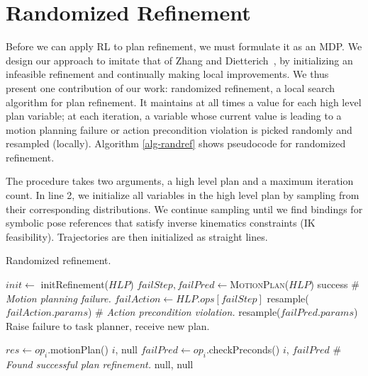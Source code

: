 \section{Randomized Refinement}
Before we can apply RL to plan refinement, we must formulate it as an MDP.
We design our approach to imitate that of Zhang and Dietterich~\cite{JobShopSched}, by
initializing an infeasible refinement and continually making local improvements.
We thus present one contribution of our work: randomized refinement, a local search
algorithm for plan refinement. It maintains at all times a value for each high level plan
variable; at each iteration, a variable whose current value is leading to a motion planning failure or
action precondition violation is picked randomly and resampled (locally).
Algorithm \ref{alg-randref} shows pseudocode for randomized refinement.

The procedure takes two arguments, a high level plan and a maximum
iteration count. In line 2, we initialize all variables in the high level plan by sampling
from their corresponding distributions. We continue sampling
until we find bindings for symbolic pose references that satisfy
inverse kinematics constraints (IK feasibility). Trajectories are then
initialized as straight lines.

\begin{algorithm}
 \caption{Randomized refinement.} \label{alg-randref}
 \begin{algorithmic}[1]
  \State $init \leftarrow$ initRefinement($HLP$)
  \State $failStep, failPred \leftarrow $\textsc{MotionPlan}($HLP$)
  \State \Return success
  \EndIf
  \State \# \emph{Motion planning failure.}
  \State $failAction \leftarrow HLP.ops[failStep]$
  \State resample($failAction.params$)
  \Else
  \State \# \emph{Action precondition violation.}
  \State resample($failPred.params$)
  \EndIf
  \EndFor
  \State Raise failure to task planner, receive new plan.
  \EndProcedure

  \State $res \leftarrow op_{i}$.motionPlan()
  \State \Return $i$, null
  \EndIf
  \State $failPred \leftarrow op_{i}$.checkPreconds()
  \State \Return $i$, $failPred$
  \EndIf
  \EndFor
  \State \# \emph{Found successful plan refinement.}
  \State \Return null, null
  \EndProcedure
 \end{algorithmic}
\end{algorithm}

